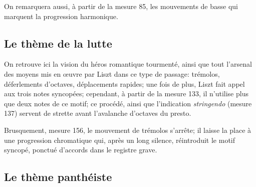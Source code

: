 \documentclass[11pt,a4paper]{scrartcl}
\begin{document}
\begin{center}
\end{center}

On remarquera aussi, à partir de la mesure 85, les mouvements de basse qui marquent
la progression harmonique.


\subsection{Le thème de la lutte}

On retrouve ici la vision du héros romantique tourmenté, ainsi que tout l'arsenal des moyens mis en \oe{}uvre par Liszt dans
ce type de passage: trémolos, déferlements d'octaves, déplacements rapides; une fois de plus, Liszt fait appel aux trois notes syncopées; cependant, à partir de la mesure 133, il n'utilise plus que deux notes de ce motif; ce procédé, ainsi que l'indication \emph{stringendo} (mesure 137) servent de strette avant l'avalanche d'octaves du presto.

Brusquement, mesure 156, le mouvement de trémolos s'arrête; il laisse la place à une progression chromatique qui, après un long silence, réintroduit le motif syncopé, ponctué d'accords dans le registre grave.

\subsection{Le thème panthéiste}
\end{document}
